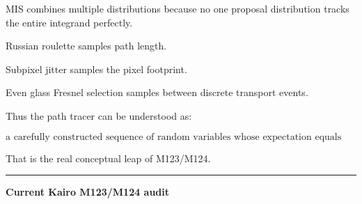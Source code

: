 MIS combines multiple distributions because no one proposal distribution tracks the entire integrand perfectly.

Russian roulette samples path length.

Subpixel jitter samples the pixel footprint.

Even glass Fresnel selection samples between discrete transport events.

Thus the path tracer can be understood as:

\[
\boxed{
\text{a carefully constructed sequence of random variables whose expectation equals the rendering equation.}
}
\]

That is the real conceptual leap of M123/M124.

\begin{center}\rule{0.5\linewidth}{0.5pt}\end{center}

\textbf{Current Kairo M123/M124 audit}


